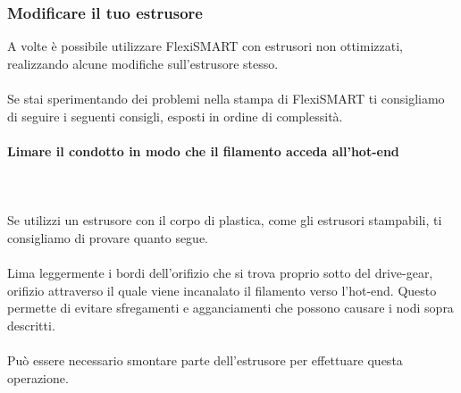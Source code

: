 \documentclass[11pt,a4paper]{article}
\begin{document}
		\subsubsection{Modificare il tuo estrusore}
A volte è possibile utilizzare FlexiSMART con estrusori non ottimizzati, realizzando alcune modifiche sull'estrusore stesso.
\\\\
Se stai sperimentando dei problemi nella stampa di FlexiSMART ti consigliamo di seguire i seguenti consigli, esposti in ordine di complessità.
			\paragraph{Limare il condotto in modo che il filamento acceda all'hot-end}\mbox{}\\\\
Se utilizzi un estrusore con il corpo di plastica, come gli estrusori stampabili, ti consigliamo di provare quanto segue. 
\\\\
Lima leggermente i bordi dell'orifizio che si trova proprio sotto del drive-gear, orifizio attraverso il quale viene incanalato il filamento verso l'hot-end. Questo permette di evitare sfregamenti e agganciamenti che possono causare i nodi sopra descritti.
\\\\
Può essere necessario smontare parte dell'estrusore per effettuare questa operazione.
\end{document}
